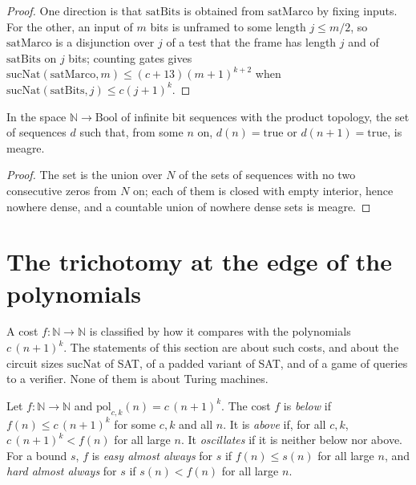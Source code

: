 \begin{proof}
  \leanok
  One direction is that $\mathrm{satBits}$ is obtained from $\mathrm{satMarco}$ by fixing inputs. For the other, an
  input of $m$ bits is unframed to some length $j \le m/2$, so $\mathrm{satMarco}$ is a disjunction over $j$ of a test
  that the frame has length $j$ and of $\mathrm{satBits}$ on $j$ bits; counting gates gives
  $\mathrm{sucNat}(\mathrm{satMarco}, m) \le (c+13)(m+1)^{k+2}$ when $\mathrm{sucNat}(\mathrm{satBits}, j) \le c(j+1)^k$.
\end{proof}

\begin{theorem}
  \label{thm:infinite-sin-dos-ceros-magro}
  \leanok
  \own{}
  In the space $\mathbb{N} \to \mathrm{Bool}$ of infinite bit sequences with the product topology, the set of
  sequences $d$ such that, from some $n$ on, $d(n) = \mathrm{true}$ or $d(n+1) = \mathrm{true}$, is meagre.
\end{theorem}

\begin{proof}
  \leanok
  The set is the union over $N$ of the sets of sequences with no two consecutive zeros from $N$ on; each of them is closed
  with empty interior, hence nowhere dense, and a countable union of nowhere dense sets is meagre.
\end{proof}

\section{The trichotomy at the edge of the polynomials}
\label{sec:infinite-trichotomy}

A cost $f : \mathbb{N} \to \mathbb{N}$ is classified by how it compares with the polynomials $c\,(n+1)^k$. The statements
of this section are about such costs, and about the circuit sizes $\mathrm{sucNat}$ of SAT, of a padded variant of SAT,
and of a game of queries to a verifier. None of them is about Turing machines.

\begin{definition}
  \label{def:infinite-bajo-sobre-oscila}
  \leanok
  \own{}
  Let $f : \mathbb{N} \to \mathbb{N}$ and $\mathrm{pol}_{c,k}(n) = c\,(n+1)^k$. The cost $f$ is \emph{below} if
  $f(n) \le c\,(n+1)^k$ for some $c, k$ and all $n$. It is \emph{above} if, for all $c, k$,
  $c\,(n+1)^k < f(n)$ for all large $n$. It \emph{oscillates} if it is neither below nor above. For a bound $s$,
  $f$ is \emph{easy almost always} for $s$ if $f(n) \le s(n)$ for all large $n$, and \emph{hard almost always} for $s$ if
  $s(n) < f(n)$ for all large $n$.
\end{definition}

